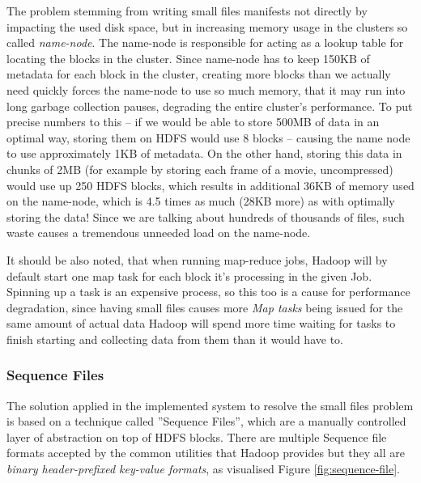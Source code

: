 The problem stemming from writing small files manifests not directly by impacting the used disk space, but in increasing memory usage in the clusters so called \textit{name-node}. The name-node is responsible for acting as a lookup table for locating the blocks in the cluster. Since name-node has to keep 150KB of metadata for each block in the cluster, creating more blocks than we actually need quickly forces the name-node to use so much memory, that it may run into long garbage collection pauses, degrading the entire cluster's performance. To put precise numbers to this -- if we would be able to store 500MB of data in an optimal way, storing them on HDFS would use 8 blocks -- causing the name node to use approximately 1KB of metadata. On the other hand, storing this data in chunks of 2MB (for example by storing each frame of a movie, uncompressed) would use up 250 HDFS blocks, which results in additional 36KB of memory used on the name-node, which is 4.5 times as much (28KB more) as with optimally storing the data! Since we are talking about hundreds of thousands of files, such waste causes a tremendous unneeded load on the name-node.

It should be also noted, that when running map-reduce jobs, Hadoop will by default start one map task for each block it's processing in the given Job. Spinning up a task is an expensive process, so this too is a cause for performance degradation, since having small files causes more \textit{Map tasks} being issued for the same amount of actual data Hadoop will spend more time waiting for tasks to finish starting and collecting data from them than it would have to.

\subsubsection{Sequence Files}
\label{sequence-file}
The solution applied in the implemented system to resolve the small files problem is based on a technique called ''Sequence Files'', which are a manually controlled layer of abstraction on top of HDFS blocks. There are multiple Sequence file formats accepted by the common utilities that Hadoop provides \cite{hadoop-seq-files} but they all are \textit{binary header-prefixed key-value formats}, as visualised Figure \ref{fig:sequence-file}.


